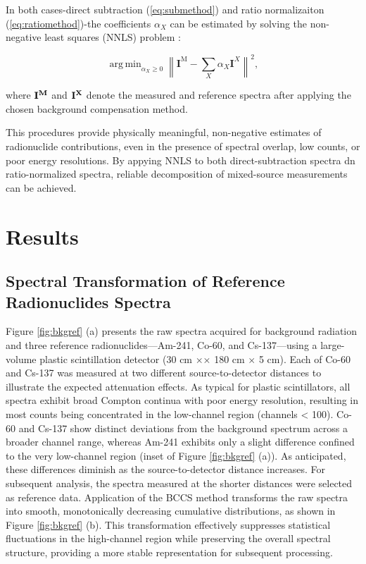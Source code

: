 \documentclass[10pt]{wlscirep}
\DeclareMathOperator*{\argmin}{arg\,min} %
\begin{document}
In both cases-direct subtraction (\ref{eq:submethod}) and ratio normalizaiton (\ref{eq:ratiomethod})-the coefficients $\alpha_X$ can be estimated by solving the non-negative least squares (NNLS) problem :

\begin{equation}
\argmin_{\alpha_X \ge 0} \left\| \textbf{I}^{\text{M}} - \sum_{X} \alpha_X \textbf{I}^{X}\right\|^2,\label{eqn:llns}
\end{equation}

where $\bf{I}^M$ and $\bf{I}^{X}$ denote the measured and reference spectra after applying the chosen background compensation method.

This procedures provide physically meaningful, non-negative estimates of radionuclide contributions, even in the presence of spectral overlap, low counts, or poor energy resolutions. By appying NNLS to both direct-subtraction spectra dn ratio-normalized spectra, reliable decomposition of mixed-source measurements can be achieved.

\section*{Results}


\subsection*{Spectral Transformation of Reference Radionuclides Spectra}

Figure \ref{fig:bkgref} (a) presents the raw spectra acquired for background radiation and three reference radionuclides—Am-241, Co-60, and Cs-137—using a large-volume plastic scintillation detector (30 cm $\times$× 180 cm $\times$ 5 cm). Each of Co-60 and Cs-137 was measured at two different source-to-detector distances to illustrate the expected attenuation effects. As typical for plastic scintillators, all spectra exhibit broad Compton continua with poor energy resolution, resulting in most counts being concentrated in the low-channel region (channels < 100). Co-60 and Cs-137 show distinct deviations from the background spectrum across a broader channel range, whereas Am-241 exhibits only a slight difference confined to the very low-channel region (inset of Figure \ref{fig:bkgref} (a)). As anticipated, these differences diminish as the source-to-detector distance increases. For subsequent analysis, the spectra measured at the shorter distances were selected as reference data.
Application of the BCCS method transforms the raw spectra into smooth, monotonically decreasing cumulative distributions, as shown in Figure \ref{fig:bkgref} (b). This transformation effectively suppresses statistical fluctuations in the high-channel region while preserving the overall spectral structure, providing a more stable representation for subsequent processing.
\end{document}
